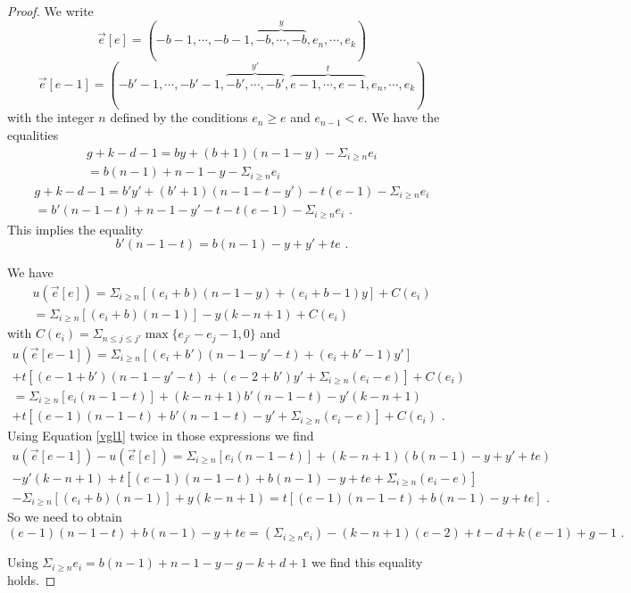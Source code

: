 \documentclass{article}
\theoremstyle{definition}
\theoremstyle{remark}
\begin{document}
\begin{proof}
We write
\[
\overrightarrow {e}[e]=(-b-1, \cdots , -b-1, \overbrace{-b, \cdots ,-b}^y,e_n, \cdots , e_k)
\]
\[
\overrightarrow {e}[e-1]=(-b'-1, \cdots , -b'-1, \overbrace {-b', \cdots , -b'}^{y' }, \overbrace {e-1, \cdots , e-1}^t, e_n , \cdots , e_k)
\]
with the integer $n$ defined by the conditions $e_n \geq e$ and $e_{n-1} <e$.
We have the equalities
\begin{multline*}
g+k-d-1=by+(b+1)(n-1-y)-\Sigma_{i \geq n}e_i \\
= b(n-1)+n-1-y-\Sigma_{i \geq n}e_i
\end{multline*}
\begin{multline*}
g+k-d-1=b'y'+(b'+1)(n-1-t-y')-t(e-1)-\Sigma _{i \geq n}e_i\\
=b'(n-1-t)+n-1-y'-t-t(e-1)-\Sigma _{i \geq n}e_i \text { .}
\end{multline*}
This implies the equality
\begin{equation}\label{vgl1}
b'(n-1-t)=b(n-1)-y+y'+te \text { .}
\end{equation}

We have
\begin{multline*}
u(\overrightarrow {e}[e])=\Sigma _{i \geq n} [(e_i+b)(n-1-y)+(e_i+b-1)y]+C(e_i)\\
=\Sigma _{i \geq n} [(e_i+b)(n-1)]-y(k-n+1)+C(e_i)
\end{multline*}
with $C(e_i)=\Sigma _{n \leq j \leq j'} \max \{ e_{j'}-e_j-1, 0 \}$ and
\begin{multline*}
u(\overrightarrow{e}[e-1])=\Sigma _{i \geq n}[(e_i+b')(n-1-y'-t)+(e_i+b'-1)y']\\
+t[(e-1+b')(n-1-y'-t)+(e-2+b')y'+\Sigma _{i \geq n}(e_i-e)]+C(e_i)\\
=\Sigma _{i \geq n} [e_i(n-1-t)]+(k-n+1)b'(n-1-t)-y'(k-n+1)\\
+t[(e-1)(n-1-t)+b'(n-1-t)-y'+\Sigma _{i \geq n} (e_i-e)]+C(e_i) \text {  .}
\end{multline*}
Using Equation \ref{vgl1} twice in those expressions we find
\begin{multline*}
u(\overrightarrow {e}[e-1])-u(\overrightarrow{e}[e])=\Sigma_{i \geq n}[e_i(n-1-t)]+(k-n+1)(b(n-1)-y+y'+te)\\
-y'(k-n+1)+t[(e-1)(n-1-t)+b(n-1)-y+te+\Sigma _{i \geq n} (e_i-e)]\\
-\Sigma_{i \geq n}[(e_i+b)(n-1)]+y(k-n+1)=t[(e-1)(n-1-t)+b(n-1)-y+te] \text { .}
\end{multline*}
So we need to obtain
\[
(e-1)(n-1-t)+b(n-1)-y+te=(\Sigma _{i \geq n}e_i)-(k-n+1)(e-2)+t-d+k(e-1)+g-1 \text { .}
\]

Using $\Sigma _{i\geq n} e_i=b(n-1)+n-1-y-g-k+d+1$ we find this equality holds.
\end{proof}
\end{document}
